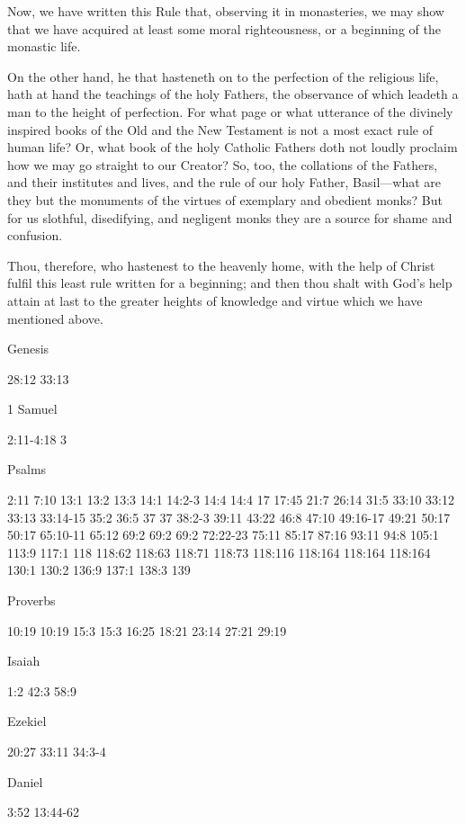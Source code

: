 
Now, we have written this Rule that, observing it in monasteries, we may show that we have acquired at least some moral righteousness, or a beginning of the monastic life.

On the other hand, he that hasteneth on to the perfection of the religious life, hath at hand the teachings of the holy Fathers, the observance of which leadeth a man to the height of perfection. For what page or what utterance of the divinely inspired books of the Old and the New Testament is not a most exact rule of human life? Or, what book of the holy Catholic Fathers doth not loudly proclaim how we may go straight to our Creator? So, too, the collations of the Fathers, and their institutes and lives, and the rule of our holy Father, Basil—what are they but the monuments of the virtues of exemplary and obedient monks? But for us slothful, disedifying, and negligent monks they are a source for shame and confusion.

Thou, therefore, who hastenest to the heavenly home, with the help of Christ fulfil this least rule written for a beginning; and then thou shalt with God's help attain at last to the greater heights of knowledge and virtue which we have mentioned above.


Genesis

28:12 33:13

1 Samuel

2:11-4:18 3

Psalms

2:11 7:10 13:1 13:2 13:3 14:1 14:2-3 14:4 14:4 17 17:45 21:7 26:14 31:5 33:10 33:12 33:13 33:14-15 35:2 36:5 37 37 38:2-3 39:11 43:22 46:8 47:10 49:16-17 49:21 50:17 50:17 65:10-11 65:12 69:2 69:2 69:2 72:22-23 75:11 85:17 87:16 93:11 94:8 105:1 113:9 117:1 118 118:62 118:63 118:71 118:73 118:116 118:164 118:164 118:164 130:1 130:2 136:9 137:1 138:3 139

Proverbs

10:19 10:19 15:3 15:3 16:25 18:21 23:14 27:21 29:19

Isaiah

1:2 42:3 58:9

Ezekiel

20:27 33:11 34:3-4

Daniel

3:52 13:44-62

